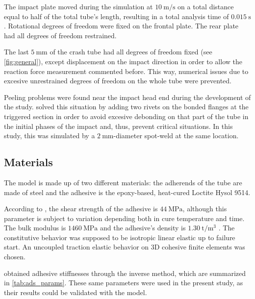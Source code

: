 \documentclass[cmfonts]{witpress}
\begin{document}
The impact plate moved during the simulation at $\SI{10}{\m/\s}$ on a total distance equal to half of the total tube's length, resulting in a total analysis time of $\SI{0.015}{\s}$. Rotational degrees of freedom were fixed on the frontal plate. The rear plate had all degrees of freedom restrained.

The last $\SI{5}{\mm}$ of the crash tube had all degrees of freedom fixed (see \cref{fig:general}), except displacement on the impact direction in order to allow the reaction force measurement commented before. This way, numerical issues due to excesive unrestrained degrees of freedom on the whole tube were prevented.

Peeling problems were found near the impact head end during the development of the study. \cite{Peroni2009} solved this situation by adding two rivets on the bonded flanges at the triggered section in order to avoid excesive debonding on that part of the tube in the initial phases of the impact and, thus, prevent critical situations. In this study, this was simulated by a $\SI{2}{\mm}$-diameter spot-weld at the same location.

\subsection{Materials}

The model is made up of two different materials: the adherends of the tube are made of steel and the adhesive is the epoxy-based, heat-cured Loctite Hysol 9514.

According to \cite{manufCatalog}, the shear strength of the adhesive is $\SI{44}{\MPa}$, although this parameter is subject to variation depending both in cure temperature and time. The bulk modulus is $\SI{1460}{\MPa}$ and the adhesive's density is $\SI{1.30}{\tonne/\m^3}$ \cite{manufCatalog}. The constitutive behavior was supposed to be isotropic linear elastic \cite{SernaMoreno2015} up to failure start. An uncoupled traction elastic behavior \cite{Sadowski2010, Sadowski2011, Scattina2011, Sadowski2014} on 3D cohesive finite elements was chosen.

\cite{Scattina2011} obtained adhesive stiffnesses through the inverse method, which are summarized in \cref{tab:ads_params}. These same parameters were used in the present study, as their results could be validated with the model.
\end{document}
